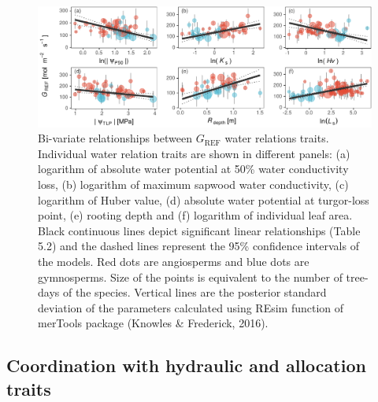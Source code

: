 \documentclass[11pt,twoside]{reedthesis}
\begin{document}
\begin{figure}[H]

{\centering \includegraphics[width=1\linewidth]{figure/CH5/Figure_3} 

}

\caption[Bi-variate relationships between $G_{\text{REF}}$ water relations traits.]{Bi-variate relationships between \(G_{\text{REF}}\) water
relations traits. Individual water relation traits are shown in
different panels: (a) logarithm of absolute water potential at 50\%
water conductivity loss, (b) logarithm of maximum sapwood water
conductivity, (c) logarithm of Huber value, (d) absolute water potential
at turgor-loss point, (e) rooting depth and (f) logarithm of individual
leaf area. Black continuous lines depict significant linear
relationships (Table 5.2) and the dashed lines represent the 95\%
confidence intervals of the models. Red dots are angiosperms and blue
dots are gymnosperms. Size of the points is equivalent to the number of
tree-days of the species. Vertical lines are the posterior standard
deviation of the parameters calculated using REsim function of merTools
package (Knowles \& Frederick, 2016).}\label{fig:ch5fig3}
\end{figure}
\subsection{Coordination with hydraulic and allocation
traits}\label{coordination-with-hydraulic-and-allocation-traits}
\end{document}
